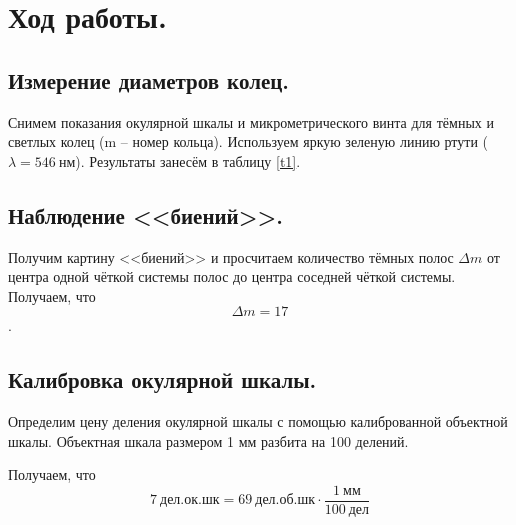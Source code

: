 \documentclass[a4paper, 12pt, twoside]{article}
\begin{document}
	\section{Ход работы.}
	
	\subsection{Измерение диаметров колец.}
	
	Снимем показания окулярной шкалы и микрометрического винта для тёмных и светлых колец (m -- номер кольца). Используем яркую зеленую линию ртути ($\lambda = 546~\text{нм}$). Результаты занесём в таблицу \ref{t1}.
	
	\begin{table}[H]
		\centering
		\caption{К определению диаметров колец.}
		\label{t1}
	\end{table}
	
	
	\newpage
	\subsection{Наблюдение <<биений>>.}
	Получим картину <<биений>> и просчитаем количество тёмных полос $\Delta m$ от центра одной чёткой системы полос до центра соседней чёткой системы. Получаем, что $$\Delta m = 17$$.
	
	\subsection{Калибровка окулярной шкалы.}
	
	Определим цену деления окулярной шкалы с помощью калиброванной объектной шкалы. Объектная шкала размером 1 мм разбита на 100 делений.
	
	Получаем, что 
	$$7~\text{дел.ок.шк} = 69~\text{дел.об.шк}\cdot \dfrac{1~\text{мм}}{100~\text{дел}}$$
	
\end{document}
